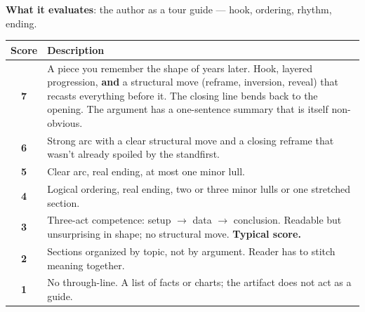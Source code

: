 \begin{tcolorbox}[promptbox, title={Rubric Evaluation scoring guideline}]
\textbf{What it evaluates}: the author as a tour guide --- hook, ordering,
rhythm, ending.
\begin{center}
\small
\begin{tabularx}{\linewidth}{cX}
\toprule
Score & Description \\
\midrule
\textbf{7} & A piece you remember the shape of years later. Hook, layered progression, \textbf{and} a structural move (reframe, inversion, reveal) that recasts everything before it. The closing line bends back to the opening. The argument has a one-sentence summary that is itself non-obvious. \\
\textbf{6} & Strong arc with a clear structural move and a closing reframe that wasn't already spoiled by the standfirst. \\
\textbf{5} & Clear arc, real ending, at most one minor lull. \\
\textbf{4} & Logical ordering, real ending, two or three minor lulls or one stretched section. \\
\textbf{3} & Three-act competence: setup $\rightarrow$ data $\rightarrow$ conclusion. Readable but unsurprising in shape; no structural move. \textbf{Typical score.} \\
\textbf{2} & Sections organized by topic, not by argument. Reader has to stitch meaning together. \\
\textbf{1} & No through-line. A list of facts or charts; the artifact does not act as a guide. \\
\bottomrule
\end{tabularx}
\end{center}



\end{tcolorbox}
